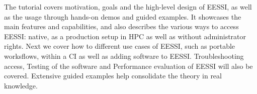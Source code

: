 
The tutorial covers motivation, goals and the high-level design of EESSI, as well as the usage through hands-on demos and guided examples. It showcases the main features and capabilities, and also describes the various ways to access EESSI: native, as a production setup in HPC as well as without administrator rights. Next we cover how to different use cases of EESSI, such as portable worksflows, within a CI as well as adding software to EESSI. Troubleshooting access, Testing of the software and Performance evaluation of EESSI will also be covered. Extensive guided examples help consolidate the theory in real knowledge.


